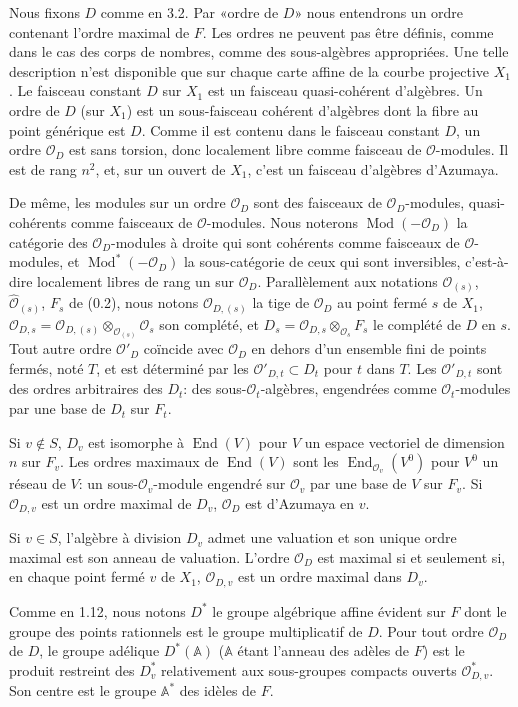 \documentclass[10pt]{article}
\newcommand{\Adele}{\mathbb A}
\newcommand{\End}{\operatorname{End}}
\newcommand{\OD}{\mathcal O_D}
\newcommand{\OO}{\mathcal O}
\theoremstyle{deligne}
\newcommand{\heading}[1]{\vspace{0.7em}\noindent{\bfseries #1}\quad}
\begin{document}
\heading{3.6.} Nous fixons $D$ comme en 3.2. Par «ordre de $D$» nous entendrons un ordre contenant l'ordre maximal de $F$. Les ordres ne peuvent pas être définis, comme dans le cas des corps de nombres, comme des sous-algèbres appropriées. Une telle description n'est disponible que sur chaque carte affine de la courbe projective $X_1$. Le faisceau constant $D$ sur $X_1$ est un faisceau quasi-cohérent d'algèbres. Un ordre de $D$ (sur $X_1$) est un sous-faisceau cohérent d'algèbres dont la fibre au point générique est $D$. Comme il est contenu dans le faisceau constant $D$, un ordre $\OD$ est sans torsion, donc localement libre comme faisceau de $\OO$-modules. Il est de rang $n^2$, et, sur un ouvert de $X_1$, c'est un faisceau d'algèbres d'Azumaya.

De même, les modules sur un ordre $\OD$ sont des faisceaux de $\OD$-modules, quasi-cohérents comme faisceaux de $\OO$-modules. Nous noterons $\operatorname{Mod}(-\OD)$ la catégorie des $\OD$-modules à droite qui sont cohérents comme faisceaux de $\OO$-modules, et $\operatorname{Mod}^*(-\OD)$ la sous-catégorie de ceux qui sont inversibles, c'est-à-dire localement libres de rang un sur $\OD$. Parallèlement aux notations $\OO_{(s)}$, $\widehat{\OO}_{(s)}$, $F_s$ de (0.2), nous notons $\mathcal O_{D,(s)}$ la tige de $\OD$ au point fermé $s$ de $X_1$, $\mathcal O_{D,s}=\mathcal O_{D,(s)}\otimes_{\OO_{(s)}}\OO_s$ son complété, et $D_s=\mathcal O_{D,s}\otimes_{\OO_s}F_s$ le complété de $D$ en $s$. Tout autre ordre $\mathcal O'_D$ coïncide avec $\OD$ en dehors d'un ensemble fini de points fermés, noté $T$, et est déterminé par les $\mathcal O'_{D,t}\subset D_t$ pour $t$ dans $T$. Les $\mathcal O'_{D,t}$ sont des ordres arbitraires des $D_t$: des sous-$\OO_t$-algèbres, engendrées comme $\OO_t$-modules par une base de $D_t$ sur $F_t$.

Si $v\notin S$, $D_v$ est isomorphe à $\End(V)$ pour $V$ un espace vectoriel de dimension $n$ sur $F_v$. Les ordres maximaux de $\End(V)$ sont les $\End_{\OO_v}(V^0)$ pour $V^0$ un réseau de $V$: un sous-$\OO_v$-module engendré sur $\OO_v$ par une base de $V$ sur $F_v$. Si $\mathcal O_{D,v}$ est un ordre maximal de $D_v$, $\OD$ est d'Azumaya en $v$.

Si $v\in S$, l'algèbre à division $D_v$ admet une valuation et son unique ordre maximal est son anneau de valuation. L'ordre $\OD$ est maximal si et seulement si, en chaque point fermé $v$ de $X_1$, $\mathcal O_{D,v}$ est un ordre maximal dans $D_v$.

\heading{3.7.} Comme en 1.12, nous notons $D^*$ le groupe algébrique affine évident sur $F$ dont le groupe des points rationnels est le groupe multiplicatif de $D$. Pour tout ordre $\OD$ de $D$, le groupe adélique $D^*(\Adele)$ ($\Adele$ étant l'anneau des adèles de $F$) est le produit restreint des $D_v^*$ relativement aux sous-groupes compacts ouverts $\mathcal O_{D,v}^*$. Son centre est le groupe $\Adele^*$ des id\`eles de $F$.
\end{document}
